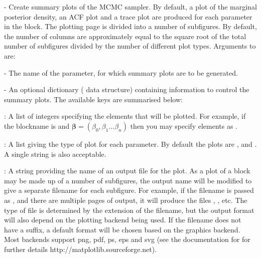 \documentclass[article]{jss}
\begin{document}
\begin{description}
\begin{description}
  \item {} - Create summary plots of
    the MCMC sampler.  By default, a plot of the marginal posterior
    density, an ACF plot and a trace plot are produced for each
    parameter in the block. The plotting page is divided into a number
    of subfigures. By default, the number of columns are approximately
    equal to the square root of the total number of subfigures divided
    by the number of different plot types. Arguments to  are:

  \begin{description}
  \item {} - The name of the parameter, for which summary
    plots are to be generated.
  \item {} - An optional dictionary
    ( data structure) containing information to
    control the summary plots.  The available keys are summarised
    below:

    \begin{description}
    \item {}: A list of integers specifying the elements
      that will be plotted. For example, if the blockname is
       and
      $\bm{\beta}=(\beta_{0},\beta_{1}\ldots\beta_{n})$ then you may
      specify elements as .
    \item {}: A list giving the type of plot for each
      parameter. By default the plots are ,
       and . A single string is also
      acceptable.
    \item {}: A string providing the name of an output
      file for the plot.  As a plot of a block may be made up of a
      number of subfigures, the output name will be modified to give a
      separate filename for each subfigure. For example, if the
      filename is passed as , and there are multiple
      pages of output, it will produce the files ,
      , etc.  The type of file is determined by the
      extension of the filename, but the output format will also
      depend on the plotting backend being used.  If the filename does
      not have a suffix, a default format will be chosen based on the
      graphics backend. Most backends support png, pdf, ps, eps and
      svg (see the documentation for  for further
      details http://matplotlib.sourceforge.net).


\end{description}
\end{description}
\end{description}
\end{description}
\end{document}
